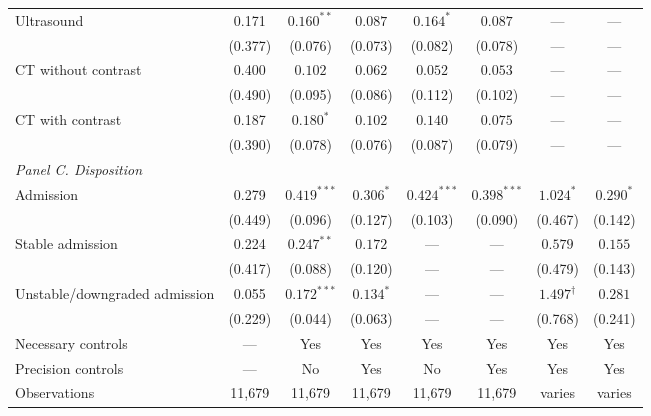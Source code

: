 \documentclass[11pt]{article}
\newcommand{\1}{\hbox{\rm 1\kern-.35em 1}}
\begin{document}
\begin{table}[t!]
\begin{threeparttable}
\begin{tabular}{lccccccc}
Ultrasound 
& 0.171
& $0.160^{**}$ & $0.087$
& $0.164^{*}$ & $0.087$
& --- & --- \\
& (0.377)
& (0.076) & (0.073)
& (0.082) & (0.078)
& --- & --- \\[0.5em]

CT without contrast 
& 0.400
& $0.102$ & $0.062$
& $0.052$ & $0.053$
& --- & --- \\
& (0.490)
& (0.095) & (0.086)
& (0.112) & (0.102)
& --- & --- \\[0.5em]

CT with contrast 
& 0.187
& $0.180^{*}$ & $0.102$
& $0.140$ & $0.075$
& --- & --- \\
& (0.390)
& (0.078) & (0.076)
& (0.087) & (0.079)
& --- & --- \\[0.5em]

\multicolumn{8}{l}{\textit{Panel C. Disposition}} \\[0.5em]

Admission 
& 0.279
& $0.419^{***}$ & $0.306^{*}$
& $0.424^{***}$ & $0.398^{***}$
& $1.024^{*}$ & $0.290^{*}$ \\
& (0.449)
& (0.096) & (0.127)
& (0.103) & (0.090)
& (0.467) & (0.142) \\[0.5em]

Stable admission
& 0.224
& $0.247^{**}$ & $0.172$
& --- & ---
& $0.579$ & $0.155$ \\
& (0.417)
& (0.088) & (0.120)
& --- & ---
& (0.479) & (0.143) \\[0.5em]

Unstable/downgraded admission
& 0.055
& $0.172^{***}$ & $0.134^{*}$
& --- & ---
& $1.497^{\dagger}$ & $0.281$ \\
& (0.229)
& (0.044) & (0.063)
& --- & ---
& (0.768) & (0.241) \\[0.5em]

\midrule
Necessary controls & --- & Yes & Yes & Yes & Yes & Yes & Yes \\
Precision controls & --- & No & Yes & No & Yes & Yes & Yes \\
Observations & 11,679 & 11,679 & 11,679 & 11,679 & 11,679 & varies & varies \\
\bottomrule
\end{tabular}


\end{threeparttable}
\end{table}
\end{document}
